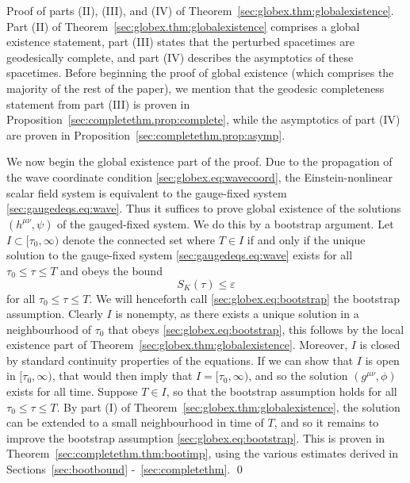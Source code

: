 \documentclass{article}
\newcommand{\ve}{\varepsilon}
\begin{document}
\begin{paragraph}{Proof of parts (II), (III), and (IV) of Theorem~\ref{sec:globex.thm:globalexistence}.}
Part (II) of Theorem~\ref{sec:globex.thm:globalexistence} comprises a global existence statement, part (III) states that the perturbed spacetimes are geodesically complete, and part (IV) describes the asymptotics of these spacetimes. Before beginning the proof of global existence (which comprises the majority of the rest of the paper), we mention that the geodesic completeness statement from part (III) is proven in Proposition~\ref{sec:completethm.prop:complete}, while the asymptotics of part (IV) are proven in Proposition~\ref{sec:completethm.prop:asymp}.

We now begin the global existence part of the proof. Due to the propagation of the wave coordinate condition \eqref{sec:globex.eq:wavecoord}, the Einstein-nonlinear scalar field system is equivalent to the gauge-fixed system \eqref{sec:gaugedeqs.eq:wave}. Thus it suffices to prove global existence of the solutions $(h^{\mu\nu},\psi)$ of the gauged-fixed system. We do this by a bootstrap argument. Let $I \subset [\tau_0,\infty)$ denote the connected set where $T \in I$ if and only if the unique solution to the gauge-fixed system \eqref{sec:gaugedeqs.eq:wave} exists for all $\tau_0 \leq \tau \leq T$ and obeys the bound
\begin{equation}\label{sec:globex.eq:bootstrap}
    S_K(\tau) \leq \ve
\end{equation}
for all $\tau_0 \leq \tau \leq T$. We will henceforth call \eqref{sec:globex.eq:bootstrap} the bootstrap assumption. Clearly $I$ is nonempty, as there exists a unique solution in a neighbourhood of $\tau_0$ that obeys \eqref{sec:globex.eq:bootstrap}, this follows by the local existence part of Theorem~\ref{sec:globex.thm:globalexistence}. Moreover, $I$ is closed by standard continuity properties of the equations. If we can show that $I$ is open in $[\tau_0,\infty)$, that would then imply that $I = [\tau_0,\infty)$, and so the solution $(g^{\mu\nu},\phi)$ exists for all time. Suppose $T \in I$, so that the bootstrap assumption holds for all $\tau_0 \leq \tau \leq T$. By part (I) of Theorem~\ref{sec:globex.thm:globalexistence}, the solution can be extended to a small neighbourhood in time of $T$, and so it remains to improve the bootstrap assumption \eqref{sec:globex.eq:bootstrap}. This is proven in Theorem~\ref{sec:completethm.thm:bootimp}, using the various estimates derived in  Sections~\ref{sec:bootbound} -~\ref{sec:completethm}.
\qed
\end{paragraph}
\end{document}
